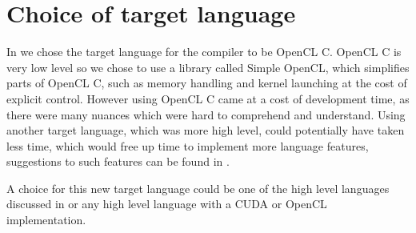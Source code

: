 \section{Choice of target language}
In  we chose the target language for the compiler to be OpenCL C.
OpenCL C is very low level so we chose to use a library called Simple OpenCL, which simplifies parts of OpenCL C, such as memory handling and kernel launching at the cost of explicit control. 
However using OpenCL C came at a cost of development time, as there were many nuances which were hard to comprehend and understand. 
Using another target language, which was more high level, could potentially have taken less time,  which would free up time to implement more language features, suggestions to such features can be found in . 

A choice for this new target language could be one of the high level languages discussed in  or any high level language with a CUDA or OpenCL implementation. 
